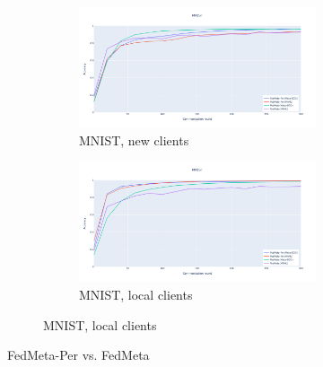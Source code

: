\documentclass[oneside,a4paper,14pt]{extreport}
\begin{document}
\begin{figure}
    \begin{subfigure}{\textwidth}
        \centering
        \begin{subfigure}{.5\textwidth}
            \centering
            \includegraphics[width=\linewidth]{./tab_img/mnist_meta_new.png}
            \caption{MNIST, new clients}
            \label{fig:mnist_meta_new}
        \end{subfigure}%
        \begin{subfigure}{.5\textwidth}
            \centering
            \includegraphics[width=\linewidth]{./tab_img/mnist_meta_old.png}
            \caption{MNIST, local clients}
            \label{fig:mnist_meta_old}
        \end{subfigure}
    \end{subfigure}
    \caption*{FedMeta-Per vs. FedMeta}
    \label{fig:fedmeta_acc}
\end{figure}
\end{document}
